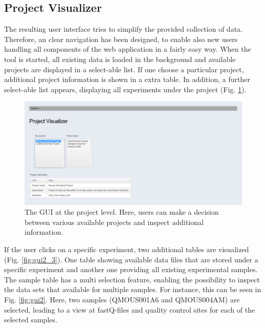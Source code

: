 \documentclass[a4paper, 11pt]{article}
\begin{document}
\subsection{Project Visualizer}
The resulting user interface tries to simplify the provided collection of data. Therefore, an clear navigation has been designed, to enable also new users handling all components of the web application in a fairly easy way. When the tool is started, all existing data is loaded in the background and available projects are displayed in a select-able list. If one choose a particular project, additional project information is shown in a extra table. In addition, a further select-able list appears, displaying all experiments under the project (Fig. \ref{fig:gui1}).
\begin{figure}[H]
\centering
\includegraphics[scale=0.30]{GUI_1.png}
\caption[The GUI at the projet level]{The GUI at the project level. Here, users can make a decision between various available projects and inspect additional information.}
\label{fig:gui1}
\end{figure}
\noindent
If the user clicks on a specific experiment, two additional tables are visualized (Fig. \ref{fig:gui2_3}). One table showing available data files that are stored under a specific experiment and another one providing all existing experimental samples. The sample table has a multi selection feature, enabling the possibility to inspect the data sets that available for multiple samples. For instance, this can be seen in Fig. \ref{fig:gui2}. Here, two samples (QMOUS001A6 and QMOUS004AM) are selected, leading to a view at fastQ-files and quality control sites for each of the selected samples.  
\end{document}
